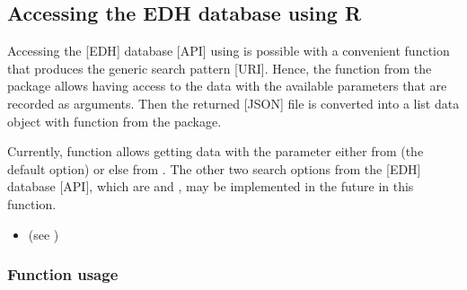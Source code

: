 \documentclass[a4paper,12pt,english]{sphinxhowto}
\begin{document}


\subsection{Accessing the EDH database using R}
\label{\detokenize{Epigraphic:accessing-the-edh-database-using-r}}
Accessing the {[}EDH{]} database {[}API{]} using  is possible with a convenient function that produces
the generic search pattern {[}URI{]}. Hence, the function  from the  package allows
having access to the data with the available parameters that are recorded as arguments. Then the
returned {[}JSON{]} file is converted into a list data object with function  from the
 package.

Currently, function  allows getting data with the  parameter
either from  (the default option) or else from .
The other two search options from the {[}EDH{]} database {[}API{]}, which are 
and , may be implemented in the future in this function.
\begin{itemize}
\item {} 
(see {\hyperref[\detokenize{sdam:sdam-pkg}]{}})

\end{itemize}



\subsubsection{Function usage}
\label{\detokenize{Epigraphic:function-usage}}

\begin{fulllineitems}
\label{\detokenize{Epigraphic:get.edh}}
\end{fulllineitems}
\end{document}
